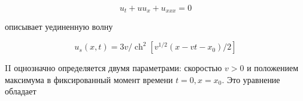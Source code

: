 \documentclass[10pt]{article}
\begin{document}
\[

u_{t}+u u_{x}+u_{x x x}=0

\]



описывает уединенную волну



\[

u_{s}(x, t)=3 v / \operatorname{ch}^{2}\left[v^{1 / 2}\left(x-v t-x_{0}\right) / 2\right]

\]



II оцнозначно определяется двумя параметрами: скоростью $v>0$ и положением максимума в фиксированный момент времени $t=0, x=x_{0}$. Это уравнение обладает
\end{document}
